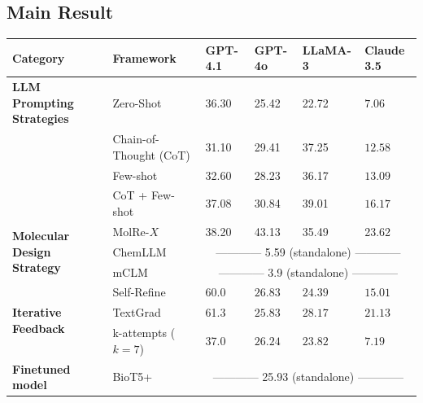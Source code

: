 \documentclass[10pt]{article} %
\begin{document}
    \subsection{Main Result}
    \label{sec:main_results}
\begin{table}[h!]
    \centering
    \small
    \begin{tabular}{llp{1.5cm}p{1.5cm}p{1.5cm}p{1.5cm}}
        \toprule
        \textbf{Category} & \textbf{Framework} & \textbf{GPT-4.1} & \textbf{GPT-4o}  & \textbf{LLaMA-3} & \textbf{Claude 3.5} \\
        \midrule
        \textbf{LLM Prompting Strategies}
        & Zero-Shot                        & 36.30            & 25.42            & 22.72            & $7.06$             \\
        & Chain-of-Thought (CoT)           & 31.10            & 29.41            & 37.25            & $12.58$            \\
        & Few-shot                         & 32.60            & 28.23            & 36.17            & $13.09$            \\
        & CoT + Few-shot                   & 37.08            & 30.84            & 39.01            & $16.17$            \\
        \midrule
        \multirow{3}{*}{\textbf{Molecular Design Strategy}}
        & MolRe-$X$~\cite{molregpt}        & 38.20            & 43.13            & 35.49            & 23.62              \\
        & \cellcolor{gray!20} ChemLLM~\cite{zhang2024chemllm}& \multicolumn{4}{c}{\cellcolor{gray!20}------------ 5.59 (standalone) ------------} \\& \cellcolor{gray!20} mCLM~\cite{zhang2024chemllm}& \multicolumn{4}{c}{\cellcolor{gray!20}------------ 3.9 (standalone) ------------} \\
        \midrule
        \multirow{3}{*}{\textbf{Iterative Feedback}}
        & Self-Refine~\cite{madaan2024self} & 60.0               & $26.83$          & $24.39$          & $15.01$            \\
        & TextGrad~\cite{yuksekgonul2025optimizing} & 61.3 & $25.83$ & $28.17$ & $21.13$\\
        & k-attempts ($k=7$) & 37.0 & $26.24$ & $23.82$ & $7.19$ \\        \midrule
        \textbf{Finetuned model} 
        & \cellcolor{gray!20} BioT5+
        & \multicolumn{4}{c}{\cellcolor{gray!20}------------ 25.93 (standalone) ------------} \\

\end{tabular}
\end{table}
\end{document}
